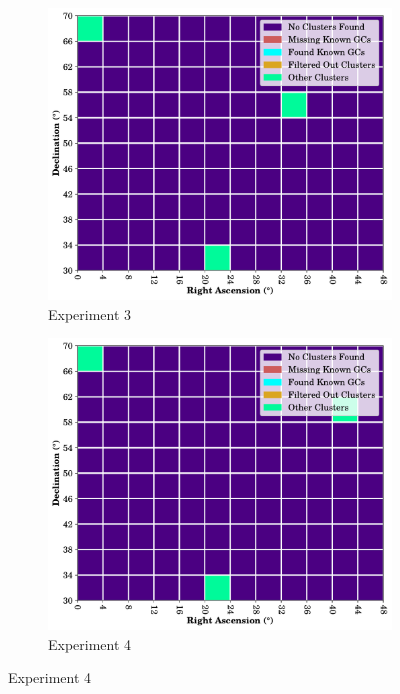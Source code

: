 \begin{figure}[H]
    \begin{subfigure}[b]{0.49\textwidth}
        \includegraphics[width=\textwidth]{./figures/rasters/grids/grid-run-03-a4.pdf}
        \caption{Experiment 3}
    \end{subfigure}
    \begin{subfigure}[b]{0.49\textwidth}
        \includegraphics[width=\textwidth]{./figures/rasters/grids/grid-run-04-a4.pdf}
        \caption{Experiment 4}
    \end{subfigure}


\end{figure}
